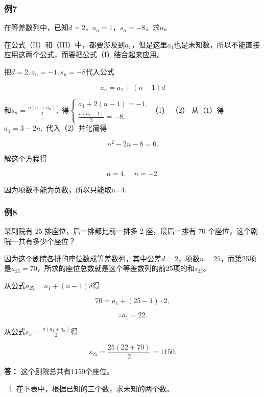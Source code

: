\subsubsection{例7}

在等差数列中，已知\(d = 2\)，\(a_{n} = 1\)，\(s_{n} = -8\)，求\(n\)。

在公式（II）和（III）中，都要涉及到\(a_{1}\)，但是这里\(a_{1}\)也是未知数，所以不能直接应用这两个公式，而要把公式（I）结合起来应用。

 把\(d = 2, a_{n} = -1, s_{n} = -8\)代入公式

\[
a_{n} = a_{1} + (n - 1) d
\]

和\(s_n = \frac{n(a_1 + a_n)}{2},\)
得\(\left\{ \begin{array}{l} a_{1} + 2(n - 1) = -1, \\ \frac{n(a_{1} - 1)}{2} = -8. \end{array} \right.\)（1）
（2） 从（1）得\(a_{1} = 3 - 2n,\) 代入（2）并化简得

\[
n^{2} - 2 n - 8 = 0.
\]

解这个方程得

\[
n = 4, \quad n = - 2.
\]

因为项数不能为负数，所以只能取n=4.

\subsubsection{例8}

某剧院有 25 排座位，后一排都比前一排多 2 座，最后一排有 70
个座位，这个剧院一共有多少个座位？

因为这个剧院各排的座位数成等差数列，其中公差\(d = 2\)，项数\(n = 25\)，而第25项是\(a_{25} = 70\)，所求的座位总数就是这个等差数列的前25项的和\(s_{25}\)。

从公式\(a_{25} = a_1 + (n - 1)d\)得

\[
70 = a_{1} + (25 - 1) \cdot 2,
\]

\[
\therefore a_{1} = 22.
\]

从公式\(s_n = \frac{n(a_1 + a_n)}{2}\)得

\[
s_{25} = \frac{25 (22 + 70)}{2} = 1150.
\]

\textbf{答：} 这个剧院总共有1150个座位。

\begin{enumerate}
\item
  在下表中，根据已知的三个数，求未知的两个数。
\end{enumerate}

